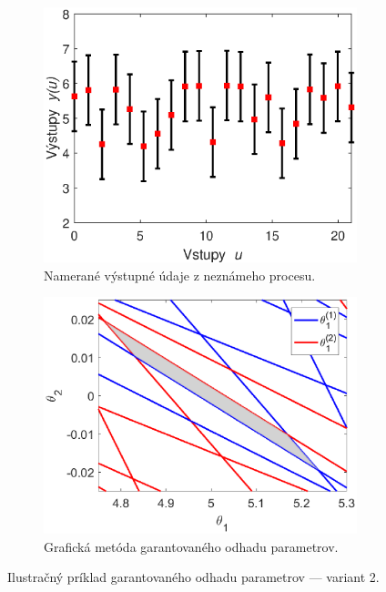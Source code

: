 \begin{figure}
	\centering
	\begin{subfigure}[b]{0.48\textwidth}
		\centering
		\includegraphics[width=\linewidth]{images/gpe_ex_data2}
		\caption{Namerané výstupné údaje z neznámeho procesu.}
		\label{fig:gpe_ex2_data}
	\end{subfigure}
	\begin{subfigure}[b]{0.48\textwidth}
		\centering
		\includegraphics[width=\linewidth]{images/gpe_ex_line2}
		\caption{Grafická metóda garantovaného odhadu parametrov.}
		\label{fig:gpe_ex2_gm}
	\end{subfigure}
	\caption{Ilustračný príklad garantovaného odhadu parametrov --- variant 2.}
	\label{fig:gpe_ex2}
\end{figure}

